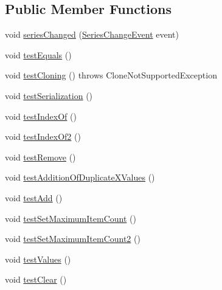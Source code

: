 \subsection*{Public Member Functions}
\begin{DoxyCompactItemize}
\item 
void \mbox{\hyperlink{classorg_1_1jfree_1_1data_1_1xy_1_1_x_y_interval_series_test_a5d77fdc32fed928c33af80502526fb2d}{series\+Changed}} (\mbox{\hyperlink{classorg_1_1jfree_1_1data_1_1general_1_1_series_change_event}{Series\+Change\+Event}} event)
\item 
void \mbox{\hyperlink{classorg_1_1jfree_1_1data_1_1xy_1_1_x_y_interval_series_test_a18385d7b652589a49b12fda44ff577ff}{test\+Equals}} ()
\item 
void \mbox{\hyperlink{classorg_1_1jfree_1_1data_1_1xy_1_1_x_y_interval_series_test_a667323bff71e1b0dd2f6675dbb8b5233}{test\+Cloning}} ()  throws Clone\+Not\+Supported\+Exception 
\item 
void \mbox{\hyperlink{classorg_1_1jfree_1_1data_1_1xy_1_1_x_y_interval_series_test_af8d23a8b8b215e9a11a7765751675ded}{test\+Serialization}} ()
\item 
void \mbox{\hyperlink{classorg_1_1jfree_1_1data_1_1xy_1_1_x_y_interval_series_test_a6ebe2edacc0e61d89e0170b028aef5bf}{test\+Index\+Of}} ()
\item 
void \mbox{\hyperlink{classorg_1_1jfree_1_1data_1_1xy_1_1_x_y_interval_series_test_a95233e66d5731571a94fd1f7db73e478}{test\+Index\+Of2}} ()
\item 
void \mbox{\hyperlink{classorg_1_1jfree_1_1data_1_1xy_1_1_x_y_interval_series_test_a11f1cb86c5a9dd6a4c72c58697a168bc}{test\+Remove}} ()
\item 
void \mbox{\hyperlink{classorg_1_1jfree_1_1data_1_1xy_1_1_x_y_interval_series_test_a966617ea6da2f7b041f6431895a19c5d}{test\+Addition\+Of\+Duplicate\+X\+Values}} ()
\item 
void \mbox{\hyperlink{classorg_1_1jfree_1_1data_1_1xy_1_1_x_y_interval_series_test_a212b99c12b5771e137337c75c17db3da}{test\+Add}} ()
\item 
void \mbox{\hyperlink{classorg_1_1jfree_1_1data_1_1xy_1_1_x_y_interval_series_test_ab92d79fba1134ba53eb763b040d2a5f6}{test\+Set\+Maximum\+Item\+Count}} ()
\item 
void \mbox{\hyperlink{classorg_1_1jfree_1_1data_1_1xy_1_1_x_y_interval_series_test_ae433a467180fd80756ca77094a0a07bb}{test\+Set\+Maximum\+Item\+Count2}} ()
\item 
void \mbox{\hyperlink{classorg_1_1jfree_1_1data_1_1xy_1_1_x_y_interval_series_test_a45d941bba6ea7a460466fd7fe191e347}{test\+Values}} ()
\item 
void \mbox{\hyperlink{classorg_1_1jfree_1_1data_1_1xy_1_1_x_y_interval_series_test_a8f260695a14f2866f6515129e65c9af6}{test\+Clear}} ()
\end{DoxyCompactItemize}



